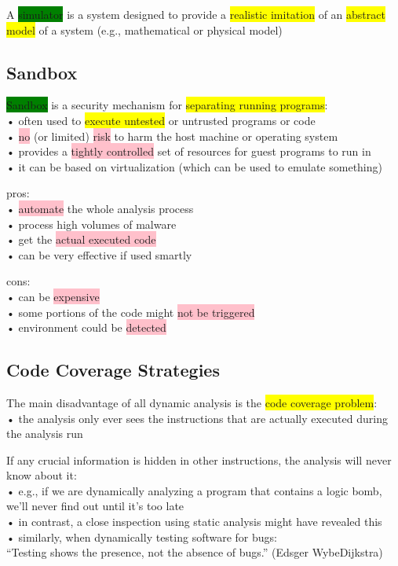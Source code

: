 \documentclass[]{project_plan}
\begin{document}
A \colorbox{green}{simulator} is a system designed to provide a \colorbox{yellow}{realistic imitation} of an \colorbox{yellow}{abstract}
\colorbox{yellow}{model} of a system (e.g., mathematical or physical model)

\subsection{Sandbox}

\colorbox{green}{Sandbox} is a security mechanism for \colorbox{yellow}{separating running programs}:\\
• often used to \colorbox{yellow}{execute untested} or untrusted programs or code\\
• \colorbox{pink}{no} (or limited) \colorbox{pink}{risk} to harm the host machine or operating system\\
• provides a \colorbox{pink}{tightly controlled} set of resources for guest programs to run in\\
• it can be based on virtualization (which can be used to emulate something)

pros:\\
• \colorbox{pink}{automate} the whole analysis
process\\
• process high volumes of malware\\
• get the \colorbox{pink}{actual executed code}\\
• can be very effective if used smartly

cons:\\
• can be \colorbox{pink}{expensive}\\
• some portions of the code might \colorbox{pink}{not be triggered}\\
• environment could be \colorbox{pink}{detected}


\subsection{Code Coverage Strategies}

The main disadvantage of all dynamic analysis is the \colorbox{yellow}{code coverage problem}:\\
• the analysis only ever sees the instructions that are actually executed during the
analysis run

If any crucial information is hidden in other instructions, the analysis will never
know about it:\\
• e.g., if we are dynamically analyzing a program that contains a logic bomb, we’ll never
find out until it’s too late\\
• in contrast, a close inspection using static analysis might have revealed this\\
• similarly, when dynamically testing software for bugs:\\
“Testing shows the presence, not the absence of bugs.” (Edsger WybeDijkstra)
\end{document}

